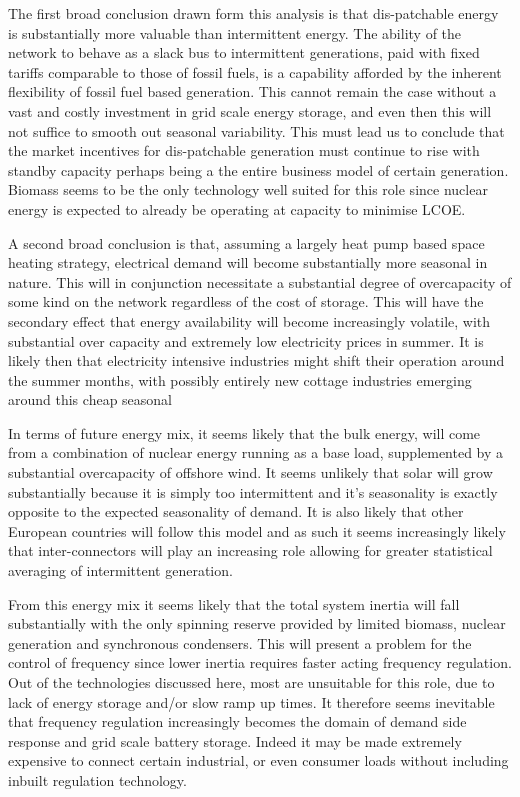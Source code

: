 \documentclass[11pt]{article}
\numberwithin{equation}{section}
\begin{document}
The first broad conclusion drawn form this analysis is that dis-patchable energy is substantially more valuable than intermittent energy. The ability of the network to behave as a slack bus to intermittent generations, paid with fixed tariffs comparable to those of fossil fuels, is a capability afforded by the inherent flexibility of fossil fuel based generation. This cannot remain the case without a vast and costly  investment in grid scale energy storage, and even then this will not suffice to smooth out seasonal variability. This must lead us to conclude that the market incentives for dis-patchable generation must continue to rise with standby capacity perhaps being a the entire business model of certain generation. Biomass seems to be the only technology well suited for this role since nuclear energy is expected to already be operating at capacity to minimise LCOE.

A second broad conclusion is that, assuming a largely heat pump based space heating strategy, electrical demand will become substantially more seasonal in nature. This will in conjunction necessitate a substantial degree of overcapacity of some kind on the network regardless of the cost of storage. This will have the secondary effect that energy availability will become increasingly volatile, with substantial over capacity and extremely low electricity prices in summer. It is likely then that electricity intensive industries might shift their operation around the summer months, with possibly entirely new cottage industries emerging around this cheap seasonal

In terms of future energy mix, it seems likely that the bulk energy, will come from a combination of nuclear energy running as a base load, supplemented by a substantial overcapacity of offshore wind. It seems unlikely that solar will grow substantially because it is simply too intermittent and it's seasonality is exactly opposite to the expected seasonality of demand. It is also likely that other European countries will follow this model and as such it seems increasingly likely that inter-connectors will play an increasing role allowing for greater statistical averaging of intermittent generation.

From this energy mix it seems likely that the total system inertia will fall substantially with the only spinning reserve provided by limited biomass, nuclear generation and synchronous condensers. This will present a problem for the control of frequency since lower inertia requires faster acting frequency regulation. Out of the technologies discussed here, most are unsuitable for this role, due to lack of energy storage and/or slow ramp up times. It therefore seems inevitable that frequency regulation increasingly becomes the domain of demand side response and grid scale battery storage. Indeed it may be made extremely expensive to connect certain industrial, or even consumer loads without including inbuilt regulation technology.
\end{document}
